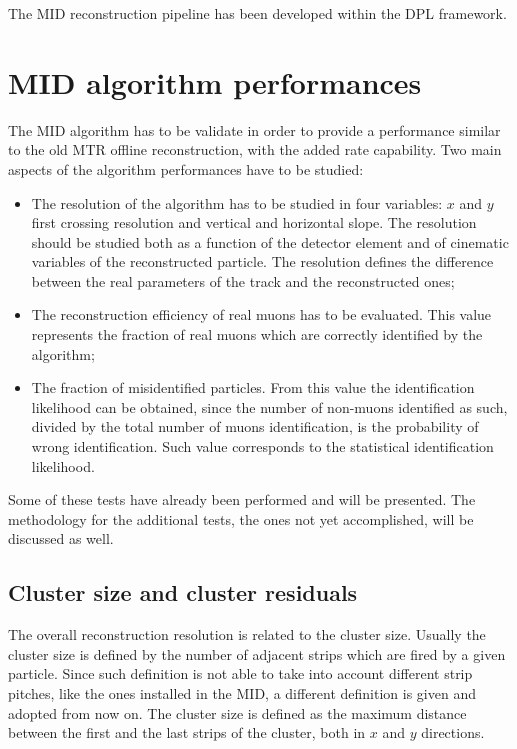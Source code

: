 The MID reconstruction pipeline has been developed within the DPL framework.

\section{MID algorithm performances}
The MID algorithm has to be validate in order to provide a performance similar to the old MTR offline reconstruction, with the added rate capability.
Two main aspects of the algorithm performances have to be studied:
\begin{itemize}
    \item The resolution of the algorithm has to be studied in four variables: $x$ and $y$ first crossing resolution and vertical and horizontal slope. The resolution should be studied both as a function of the detector element and of cinematic variables of the reconstructed particle. The resolution defines the difference between the real parameters of the track and the reconstructed ones;
    \item The reconstruction efficiency of real muons has to be evaluated. This value represents the fraction of real muons which are correctly identified by the algorithm;
    \item The fraction of misidentified particles. From this value the identification likelihood can be obtained, since the number of non-muons identified as such, divided by the total number of muons identification, is the probability of wrong identification. Such value corresponds to the statistical identification likelihood.
\end{itemize}

Some of these tests have already been performed and will be presented.
The methodology for the additional tests, the ones not yet accomplished, will be discussed as well.

\subsection{Cluster size and cluster residuals}
The overall reconstruction resolution is related to the cluster size.
Usually the cluster size is defined by the number of adjacent strips which are fired by a given particle.
Since such definition is not able to take into account different strip pitches, like the ones installed in the MID, a different definition is given and adopted from now on.
The cluster size is defined as the maximum distance between the first and the last strips of the cluster, both in $x$ and $y$ directions.

